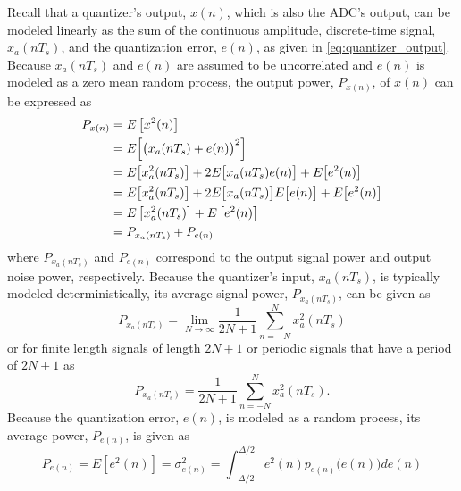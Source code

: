 Recall that a quantizer's output, $x(n)$, which is also the ADC's output,
can be modeled linearly as the sum of the continuous amplitude, discrete-time signal,
$x_a(n T_s)$, and the quantization error, $e(n)$, as given in \eqref{eq:quantizer_output}.
Because $x_a(n T_s)$ and $e(n)$ are assumed to be uncorrelated and $e(n)$ is modeled as a
zero mean random process, the output power, $P_{x(n)}$, of $x(n)$ can be expressed as
\begin{equation}\label{eq:output_power}
\begin{split}
P_{x(n)}& = E\left[x^2(n)\right]\\
& = E\Bigl[\bigl(x_a(nT_s) + e(n)\bigr)^2\Big]\\
& = E\bigl[x^2_a(nT_s)\bigr]+2E\bigl[x_a(nT_s)e(n)\bigr]+E\bigl[e^2(n)\bigr]\\
& =
E\bigl[x^2_a(nT_s)\bigr]+2E\bigl[x_a(nT_s)\bigr]E\bigl[e(n)\bigr]+E\bigl[e^2(n)\bigr]\\
& = E\left[x_a^2(n T_s)\right]+E\left[e^2(n)\right]\\
& =P_{x_a(n T_s)} + P_{e(n)} 
\end{split}
\end{equation}
where $P_{x_a(n T_s)}$ and $P_{e(n)}$ correspond to the output signal power and output
noise power, respectively. Because the quantizer's input, $x_a(nT_s)$, is
typically modeled deterministically, its average signal power, $P_{x_a(n T_s)}$, can 
be given as
\begin{equation}\label{eq:average_quantizer_input_power}
 P_{x_a(n T_s)} = \lim_{N \to\infty}\frac{1}{2N+1}\sum_{n=-N}^{N}x_a^2(nT_s)
\end{equation}
or for finite length signals of length $2N+1$ or periodic signals that have a period of 
$2N+1$ as
\begin{equation}\label{eq:average_quantizer_input_power_finite_length}
 P_{x_a(n T_s)} =\frac{1}{2N+1}\sum_{n=-N}^{N}x_a^2(nT_s).
\end{equation}
Because the quantization error, $e(n)$, is modeled as a random process, its
average power, $P_{e(n)}$, is given as
\begin{equation}\label{eq:average_quantization_noise_power}
 P_{e(n)}=E\left[e^2(n)\right]=\sigma_{e(n)}^2=\int_{-\Delta/2}^{\Delta/2}
e^2(n)p_ { e(n) }\bigl(e(n)\bigr) de(n)
\end{equation}

